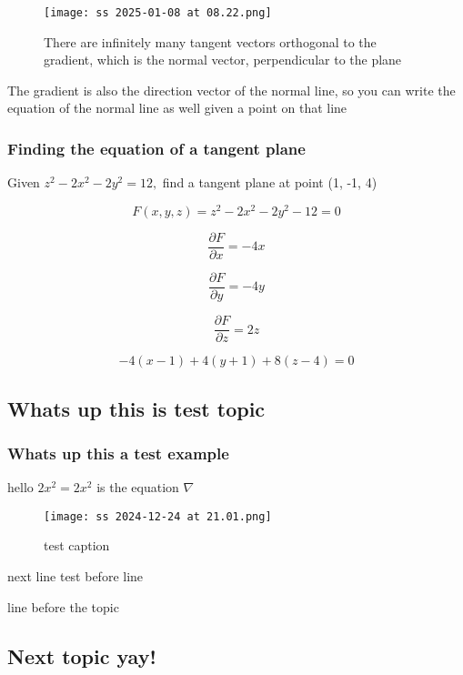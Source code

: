 \documentclass{article}
\begin{document}
\begin{figure}[h]
\caption{There are infinitely many tangent vectors orthogonal to the gradient, which is the normal vector, perpendicular to the plane}
\centering
\texttt{[image: ss 2025-01-08 at 08.22.png]}
\end{figure}
The gradient is also the direction vector of the normal line, so you can write the equation of the normal line as well given a point on that line\\

\subsubsection{Finding the equation of a tangent plane}
Given $z^2 - 2x^2 - 2y^2 = 12,$ find a tangent plane at point (1, -1, 4)

\begin{equation}
F(x, y, z) = z^2 - 2x^2 - 2y^2 - 12 = 0
\end{equation}

\begin{equation}
\frac{\partial F}{\partial x} = -4x
\end{equation}

\begin{equation}
\frac{\partial F}{\partial y} = -4y
\end{equation}

\begin{equation}
\frac{\partial F}{\partial z} = 2z
\end{equation}

\begin{equation}
-4(x-1) + 4(y+1) +8(z-4) = 0
\end{equation}

\subsection{Whats up this is test topic}


\subsubsection{Whats up this a test example}

hello $2x^2 = 2x^2$ is the equation $\nabla$


\begin{figure}[h]
\caption{ test caption}
\centering
\texttt{[image: ss 2024-12-24 at 21.01.png]}
\end{figure}

next line test before line

line before the topic
\\

\subsection{Next topic yay!}
\end{document}
